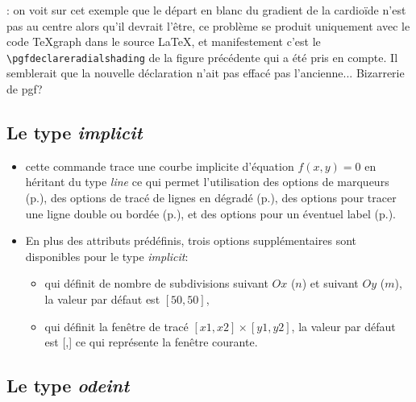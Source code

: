 \noindent{}: on voit sur cet exemple que le départ en blanc du gradient de la cardioïde n'est pas au centre alors qu'il devrait l'être, ce problème se produit uniquement avec le code TeXgraph dans le source \LaTeX, et manifestement c'est le \verb|\pgfdeclareradialshading| de la figure précédente qui a été pris en compte. Il semblerait que la nouvelle déclaration n'ait pas effacé pas l'ancienne... Bizarrerie de pgf?


\subsection{Le type \emph{implicit}}\label{macdrawimplicit}

{\centering {}\par}

\begin{itemize}
 \item \desc cette commande trace une courbe implicite d'équation $f(x,y)=0$ en héritant du type \emph{line} ce qui permet l'utilisation des options de marqueurs (p.\pageref{marqueurs}), des options de tracé de lignes en dégradé (p.\pageref{gradLines}), des options pour tracer une ligne double ou bordée (p.\pageref{optionsline}), et des options pour un éventuel label (p.\pageref{optionslabels}).
 \item En plus des attributs prédéfinis, trois options supplémentaires sont disponibles pour le type \emph{implicit}:\label{implicit}
  \begin{itemize}
  \item {} qui définit de nombre de subdivisions suivant $Ox$ ($n$) et suivant $Oy$ ($m$), la valeur par défaut est $[50,50]$, 
  \item {} qui définit la fenêtre de tracé $[x1,x2]\times[y1,y2]$, la valeur par défaut est [\jump,\jump] ce qui représente la fenêtre courante.
  \end{itemize}
\end{itemize}

\subsection{Le type \emph{odeint}}\label{typeodeint}

{\centering {}\par}

